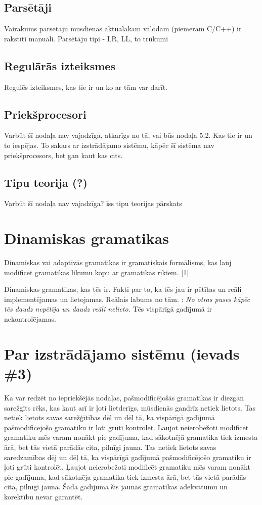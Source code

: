 \documentclass[12pt]{report}
\newcommand{\fixme}[1]{\vskip 5mm\noindent{\bf FIXME}: {\it #1}}
\begin{document}
\subsection{Parsētāji}
Vairākums parsētāju mūsdienās aktuālākam valodām (piemēram C/C++) ir rakstīti manuāli. 
Parsētāju tipi - LR, LL, to trūkumi

\subsection{Regulārās izteiksmes}
Regulēs izteiksmes, kas tie ir un ko ar tām var darīt.

\subsection{Priekšprocesori}
Varbūt šī nodaļa nav vajadzīga, atkarīgs no tā, vai būs nodaļa 5.2.
Kas tie ir un to iespējas.
To sakars ar izstrādājamo sistēmu, kāpēc šī sistēma nav priekšprocesors, bet gan kaut kas cits.

\subsection{Tipu teorija (?)}
Varbūt šī nodaļa nav vajadzīga?
īss tipu teorijas pārskats

\section{Dinamiskas gramatikas}
Dinamiskas vai adaptīvās gramatikas ir gramatiskais formālisms, kas ļauj modificēt gramatikas likumu kopu ar gramatikas rīkiem. [1]



Dinamiskas gramatikas, kas tēs ir. Fakti par to, ka tēs jau ir pētītas un reāli implementējamas un lietojamas. Reālais labums no tām.
\fixme{No otras puses kāpēc tēs daudz nepētīja un daudz reāli nelieto.} Tēs vispārīgā gadījumā ir nekontrolējamas.



\section{Par izstrādājamo sistēmu (ievads \#3)}
Ka var redzēt no iepriekšējās nodaļas, pašmodificējošās gramatikas ir diezgan sarežģīts rēks, kas kaut arī ir ļoti lietderīgs, mūsdienās gandrīz netiek lietots. Tas netiek lietots savas sarežģītības dēļ un dēļ tā, ka vispārīgā gadījumā pašmodificējošo gramatiku ir ļoti grūti kontrolēt. Ļaujot neierobežoti modificēt gramatiku mēs varam nonākt pie gadījuma, kad sākotnējā gramatika tiek izmesta ārā, bet tās vietā parādās cita, pilnīgi jauna. Tas netiek lietots savas saredzamības dēj un dēļ tā, ka vispārīgā gadījumā pašmodificējošo gramatiku ir ļoti grūti kontrolēt. Ļaujot neierobežoti modificēt gramatiku mēs varam nonākt pie gadījuma, kad sākotnēja gramatika tiek izmesta ārā, bet tās vietā parādās cita, pilnīgi jauna. Šādā gadījumā šīs jaunās gramatikas adekvātumu un korektību nevar garantēt.
\end{document}
